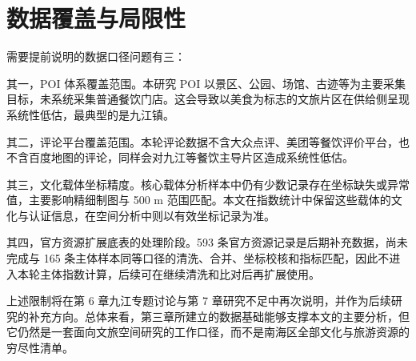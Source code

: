 \section{数据覆盖与局限性}\label{ux6570ux636eux8986ux76d6ux4e0eux5c40ux9650ux6027}

需要提前说明的数据口径问题有三：

其一，POI 体系覆盖范围。本研究 POI 以景区、公园、场馆、古迹等为主要采集目标，未系统采集普通餐饮门店。这会导致以美食为标志的文旅片区在供给侧呈现系统性低估，最典型的是九江镇。

其二，评论平台覆盖范围。本轮评论数据不含大众点评、美团等餐饮评价平台，也不含百度地图的评论，同样会对九江等餐饮主导片区造成系统性低估。

其三，文化载体坐标精度。核心载体分析样本中仍有少数记录存在坐标缺失或异常值，主要影响精细制图与 500 m 范围匹配。本文在指数统计中保留这些载体的文化与认证信息，在空间分析中则以有效坐标记录为准。

其四，官方资源扩展底表的处理阶段。593 条官方资源记录是后期补充数据，尚未完成与 165 条主体样本同等口径的清洗、合并、坐标校核和指标匹配，因此不进入本轮主体指数计算，后续可在继续清洗和比对后再扩展使用。

上述限制将在第 6 章九江专题讨论与第 7 章研究不足中再次说明，并作为后续研究的补充方向。总体来看，第三章所建立的数据基础能够支撑本文的主要分析，但它仍然是一套面向文旅空间研究的工作口径，而不是南海区全部文化与旅游资源的穷尽性清单。
